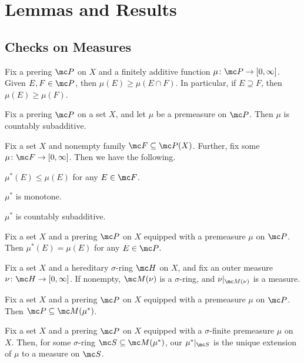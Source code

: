 \documentclass{article}
\begin{document}
\newpage
\section{Lemmas and Results}

\subsection{Checks on Measures}
\begin{lemma}[Monotone] \label{lem:fin-additive-is-monotone}
	Fix a prering $\mc P$ on $X$ and a finitely additive function $\mu\colon\mc P\to[0,\infty]$. Given $E,F\in\mc P$, then $\mu(E)\ge\mu(E\cap F)$. In particular, if $E\supseteq F$, then $\mu(E)\ge\mu(F)$.
\end{lemma}
\begin{lemma}
	Fix a prering $\mc P$ on a set $X$, and let $\mu$ be a premeasure on $\mc P$. Then $\mu$ is countably subadditive.
\end{lemma}
\begin{lemma} \label{lem:hered-measure-facts}
	Fix a set $X$ and nonempty family $\mc F\subseteq\mc P(X)$. Further, fix some $\mu\colon\mc F\to[0,\infty]$. Then we have the following.
	\begin{listalph}
		\item $\mu^*(E)\le\mu(E)$ for any $E\in\mc F$.
		\item $\mu^*$ is monotone.
		\item $\mu^*$ is countably subadditive.
	\end{listalph}
\end{lemma}
\begin{lemma} \label{lem:hered-measure-extends}
	Fix a set $X$ and a prering $\mc P$ on $X$ equipped with a premeasure $\mu$ on $\mc P$. Then $\mu^*(E)=\mu(E)$ for any $E\in\mc P$.
\end{lemma}
\begin{theorem} \label{thm:from-outer}
	Fix a set $X$ and a hereditary $\sigma$-ring $\mc H$ on $X$, and fix an outer measure $\nu\colon\mc H\to[0,\infty]$. If nonempty, $\mc M(\nu)$ is a $\sigma$-ring, and $\nu|_{\mc M(\nu)}$ is a measure.
\end{theorem}
\begin{theorem} \label{thm:prering-is-measurable}
	Fix a set $X$ and a prering $\mc P$ on $X$ equipped with a premeasure $\mu$ on $\mc P$. Then $\mc P\subseteq\mc M(\mu^*)$.
\end{theorem}
\begin{theorem} \label{thm:measure-extension-unique}
	Fix a set $X$ and a prering $\mc P$ on $X$ equipped with a $\sigma$-finite premeasure $\mu$ on $X$. Then, for some $\sigma$-ring $\mc S\subseteq\mc M(\mu^*)$, our $\mu^*|_{\mc S}$ is the unique extension of $\mu$ to a measure on $\mc S$.
\end{theorem}
\end{document}
